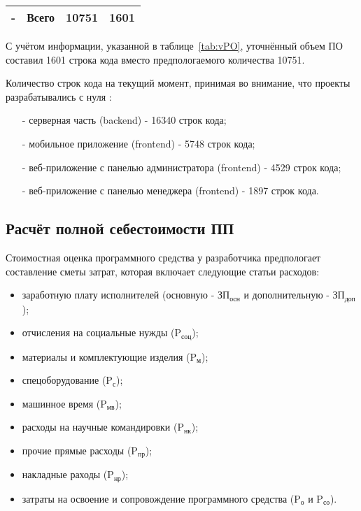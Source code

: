 \begin{table}[h!]
\begin{tabular}{|p{1cm}|p{8.5cm}|p{3cm}|p{3cm}|}
        \multicolumn{1}{|c|}{-}   & Всего                                                   & \multicolumn{1}{r|}{10751}& \multicolumn{1}{r|}{1601} \\ \hline
    \end{tabular}
\end{table}

С учётом информации, указанной в таблице~\ref{tab:vPO}, уточнённый объем ПО составил 1601 строка кода
вместо предпологаемого количества 10751.

Количество строк кода на текущий момент, принимая во внимание, что проекты разрабатывались с нуля \cite{LinuxCloc}:
\begin{enumerate}
    \item[-] серверная часть (backend) - 16340 строк кода;
    \item[-] мобильное приложение (frontend) - 5748 строк кода;
    \item[-] веб-приложение с панелью администратора (frontend) - 4529 строк кода;
    \item[-] веб-приложение с панелью менеджера (frontend) - 1897 строк кода.
\end{enumerate}

\subsection{Расчёт полной себестоимости ПП}

Стоимостная оценка программного средства у разработчика предпологает составление сметы затрат,
которая включает следующие статьи расходов:

\begin{itemize}
    \item заработную плату исполнителей (основную - $\text{ЗП}_{\text{осн}}$ и дополнительную - $\text{ЗП}_{\text{доп}}$);
    \item отчисления на социальные нужды ($\text{P}_{\text{соц}}$);
    \item материалы и комплектующие изделия ($\text{P}_{\text{м}}$);
    \item спецоборудование ($\text{P}_{\text{с}}$);
    \item машинное время ($\text{P}_{\text{мв}}$);
    \item расходы на научные командировки ($\text{P}_{\text{нк}}$);
    \item прочие прямые расходы ($\text{P}_{\text{пр}}$);
    \item накладные раходы ($\text{P}_{\text{нр}}$);
    \item затраты на освоение и сопровождение программного средства ($\text{P}_{\text{о}}$ и $\text{P}_{\text{со}}$).
\end{itemize}

